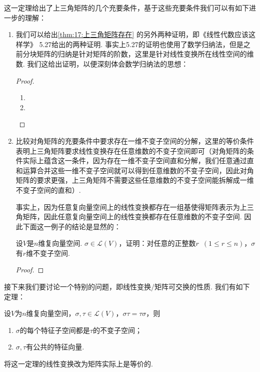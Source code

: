 这一定理给出了上三角矩阵的几个充要条件，基于这些充要条件我们可以有如下进一步的理解：
\begin{enumerate}
    \item 我们可以给出\autoref{thm:17:上三角矩阵存在} 的另外两种证明，即《线性代数应该这样学》
          5.27给出的两种证明. 事实上5.27的证明也使用了数学归纳法，但是之前分块矩阵的归纳是针对矩阵的阶数，这里是针对线性变换所在线性空间的维数. 我们这给出证明，以便深刻体会数学归纳法的思想：

          \begin{proof}
              \begin{enumerate}
                  \item

                  \item
              \end{enumerate}
          \end{proof}

    \item 比较对角矩阵的充要条件中要求存在一维不变子空间的分解，这里的等价条件表明上三角矩阵要求线性变换存在任意维数的不变子空间即可（对角矩阵的条件实际上蕴含这一条件，因为存在一维不变子空间直和分解，我们任意通过直和运算合并这些一维不变子空间就可以得到任意维数的不变子空间，因此对角矩阵的要求更强，上三角矩阵不需要这些任意维数的不变子空间能拆解成一维不变子空间的直和）.

          事实上，因为任意复向量空间上的线性变换都存在一组基使得矩阵表示为上三角矩阵，因此任意复向量空间上的线性变换都存在任意维数的不变子空间. 因此下面这一例子的结论是显然的：
          \begin{example}
              设$V$是$n$维复向量空间. $\sigma\in \mathcal{L}(V)$，证明：对任意的正整数$r\enspace(1\leqslant r\leqslant n)$，$\sigma$有$r$维不变子空间.
          \end{example}
          \begin{proof}

          \end{proof}
\end{enumerate}

接下来我们要讨论一个特别的问题，即线性变换/矩阵可交换的性质. 我们有如下定理：
\begin{theorem}
    设$V$为$n$维复向量空间，$\sigma,\tau\in \mathcal{L}(V)$，$\sigma\tau=\tau\sigma$，则
    \begin{enumerate}
        \item $\sigma$的每个特征子空间都是$\tau$的不变子空间；

        \item $\sigma,\tau$有公共的特征向量.
    \end{enumerate}
\end{theorem}
将这一定理的线性变换改为矩阵实际上是等价的.

